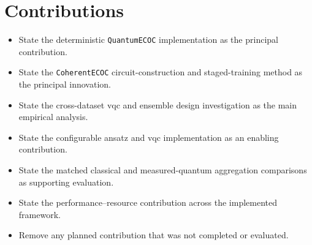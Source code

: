 \documentclass[]{UCD_CS_MSc_AAI_Report}
\begin{document}
\section{Contributions}
\label{sec:conclusion-contributions}
\begin{itemize}
    \item State the deterministic \texttt{QuantumECOC} implementation as the principal contribution.
    \item State the \texttt{CoherentECOC} circuit-construction and staged-training method as the principal innovation.
    \item State the cross-dataset \ac{vqc} and ensemble design investigation as the main empirical analysis.
    \item State the configurable ansatz and \ac{vqc} implementation as an enabling contribution.
    \item State the matched classical and measured-quantum aggregation comparisons as supporting evaluation.
    \item State the performance--resource contribution across the implemented framework.
    \item Remove any planned contribution that was not completed or evaluated.
\end{itemize}
\end{document}
